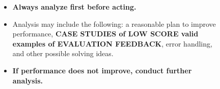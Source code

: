 \begin{figure}[ht]
\begin{tcolorbox}[colback=black!15!white, colframe=black, title=Goal Prompt of \framework]
\begin{itemize}[leftmargin=*,itemsep=1pt]
    \begin{itemize}
        \item \textbf{Always analyze first before acting.}
        \item Analysis may include the following: a reasonable plan to improve performance, \textbf{CASE STUDIES of LOW SCORE valid examples of EVALUATION FEEDBACK}, error handling, and other possible solving ideas.
        \item \textbf{If performance does not improve, conduct further analysis.}
    \end{itemize}
\end{itemize}

\end{tcolorbox}
\end{figure}
